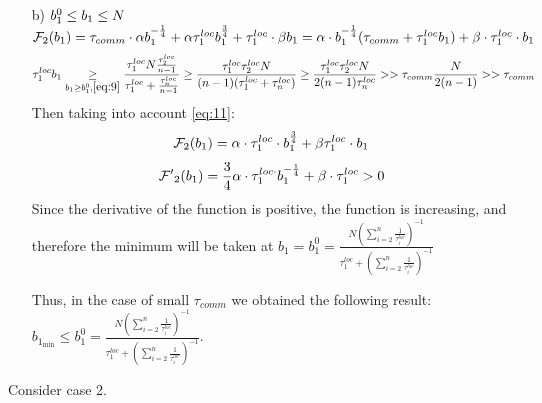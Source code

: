 \documentclass{article}
\begin{document}
\begin{itemize}
    \item[b)] $b_1^0\leq b_1\leq N\\$
    $\mathcal{F}_2(b_1) = \tau_{comm}\cdot 
    \alpha  b_1^{-\frac{1}{4}} + 
    \alpha\tau_1^{loc} b_1^{\frac{3}{4}}  + \tau_1^{loc}\cdot \beta b_1 =  \alpha\cdot b_1^{-\frac{1}{4}}(\tau_{comm} + \tau_1^{loc}b_1) + \beta\cdot\tau_1^{loc}\cdot b_1\\$
    \begin{eqnarray}
        \label{eq:11}
        \begin{split}
            \tau_1^{loc}b_1\underset{b_1\geq b_1^0, \ref{eq:9}}{\geq} \frac{\tau_1^{loc}N\frac{\tau_2^{loc}}{n - 1}}{\tau_1^{loc} + \frac{\tau_n^{loc}}{n - 1}}\geq \frac{\tau_1^{loc}\tau_2^{loc}N}{(n - 1)(\tau_1^{loc} + \tau_n^{loc})}\geq \frac{\tau_1^{loc}\tau_2^{loc}N}{2(n - 1)\tau_n^{loc}} >> \tau_{comm}\frac{N}{2(n - 1)} >> \tau_{comm}
        \end{split}
    \end{eqnarray}
    Then taking into account \ref{eq:11}:
    \begin{equation}
        \notag
        \mathcal F_2(b_1) = \alpha\cdot\tau_1^{loc}\cdot b_1^{\frac{3}{4}} + \beta \tau_1^{loc}\cdot b_1
    \end{equation}
    \begin{equation}
        \notag
        \mathcal{F'}_2(b_1) = \frac{3}{4}\alpha\cdot\tau_1^{loc\cdot} b_1^{-\frac{1}{4}} + \beta\cdot\tau_1^{loc} > 0
    \end{equation}
    Since the derivative of the function is positive, the function is increasing, and therefore the minimum will be taken at $b_1 = b_1^{0} = \frac{N (\sum\limits_{i = 2}^{n} \frac{1}{\tau_i^{loc}})^{-1}}{\tau_1^{loc} + (\sum\limits_{i = 2}^{n} \frac{1}{\tau_i^{loc}})^{-1}}$  

Thus, in the case of small $\tau_{comm}$ we obtained the following result:\\
$b_1_{\min} \leq b_1^{0} = \frac{N (\sum\limits_{i = 2}^{n} \frac{1}{\tau_i^{loc}})^{-1}}{\tau_1^{loc} + (\sum\limits_{i = 2}^{n} \frac{1}{\tau_i^{loc}})^{-1}}$.
\end{itemize}
Consider case 2.
\end{document}
